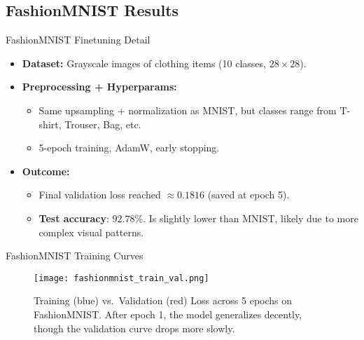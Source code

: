 \documentclass{beamer}
\begin{document}
\subsection{FashionMNIST Results}
\begin{frame}{FashionMNIST Finetuning Detail}
    \begin{itemize}
        \item \textbf{Dataset:} Grayscale images of clothing items (10 classes, $28\times 28$).
        \item \textbf{Preprocessing + Hyperparams:}
              \begin{itemize}
                  \item Same upsampling + normalization as MNIST, but classes range from T-shirt, Trouser, Bag, etc.
                  \item 5-epoch training, AdamW, early stopping.
              \end{itemize}
        \item \textbf{Outcome:}
              \begin{itemize}
                \item Final validation loss reached $\approx 0.1816$ (saved at epoch 5).
                \item \textbf{Test accuracy}: $92.78\%$. Is slightly lower than MNIST, likely due to more complex visual patterns.
              \end{itemize}
    \end{itemize}
\end{frame}

\begin{frame}{FashionMNIST Training Curves}
    \begin{figure}[h]
        \centering
        \texttt{[image: fashionmnist\_train\_val.png]}
        \caption{Training (blue) vs.\ Validation (red) Loss across 5 epochs on FashionMNIST. After epoch 1, the model generalizes decently, though the validation curve drops more slowly.}
    \end{figure}
\end{frame}
\end{document}
